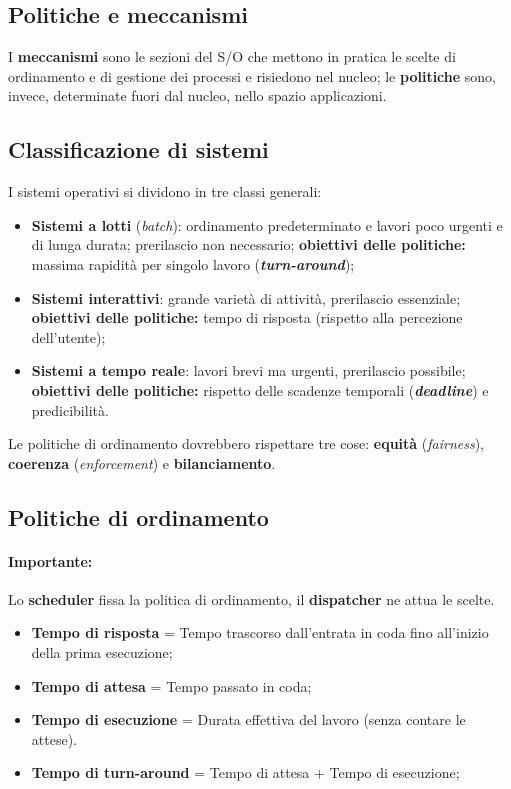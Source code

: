 \documentclass{article}
\begin{document}
\subsection{Politiche e meccanismi} I \textbf{meccanismi} sono le sezioni del S/O che mettono in pratica le scelte di ordinamento e di gestione dei processi e risiedono nel nucleo; le \textbf{politiche} sono, invece, determinate fuori dal nucleo, nello spazio applicazioni.

\subsection{Classificazione di sistemi} I sistemi operativi si dividono in tre classi generali: 
\begin{itemize}
    \item \textbf{Sistemi a lotti} (\textit{batch}): ordinamento predeterminato e lavori poco urgenti e di lunga durata; prerilascio non necessario; \textbf{obiettivi delle politiche:} massima rapidità per singolo lavoro (\textit{\textbf{turn-around}});
    \item \textbf{Sistemi interattivi}: grande varietà di attività, prerilascio essenziale; \textbf{obiettivi delle politiche:} tempo di risposta (rispetto alla percezione dell'utente);
    \item \textbf{Sistemi a tempo reale}: lavori brevi ma urgenti, prerilascio possibile; \textbf{obiettivi delle politiche:} rispetto delle scadenze temporali (\textit{\textbf{deadline}}) e predicibilità.
\end{itemize}

Le politiche di ordinamento dovrebbero rispettare tre cose: \textbf{equità} (\textit{fairness}), \textbf{coerenza} (\textit{enforcement}) e \textbf{bilanciamento}.

\subsection{Politiche di ordinamento} \paragraph{Importante:} Lo \textbf{scheduler} fissa la politica di ordinamento, il \textbf{dispatcher} ne attua le scelte.

\begin{itemize}
    \item \textbf{Tempo di risposta} = Tempo trascorso dall'entrata in coda fino all'inizio della prima esecuzione;
    \item \textbf{Tempo di attesa} = Tempo passato in coda;
    \item \textbf{Tempo di esecuzione} = Durata effettiva del lavoro (senza contare le attese).
    \item \textbf{Tempo di turn-around} = Tempo di attesa + Tempo di esecuzione;
\end{itemize}
\end{document}
